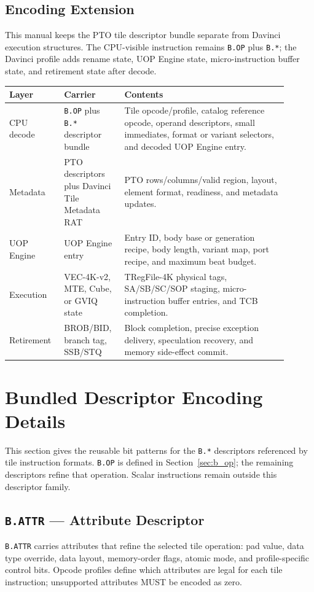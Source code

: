 \subsection{Encoding Extension}
This manual keeps the PTO tile descriptor bundle separate from Davinci execution structures. The CPU-visible instruction remains \texttt{B.OP} plus \texttt{B.*}; the Davinci profile adds rename state, UOP Engine state, micro-instruction buffer state, and retirement state after decode.
\begin{longtable}{@{}L{0.18\linewidth}L{0.18\linewidth}L{0.54\linewidth}@{}}
\toprule
Layer & Carrier & Contents \\
\midrule
CPU decode & \texttt{B.OP} plus \texttt{B.*} descriptor bundle & Tile opcode/profile, catalog reference opcode, operand descriptors, small immediates, format or variant selectors, and decoded UOP Engine entry. \\
Metadata & PTO descriptors plus Davinci Tile Metadata RAT & PTO rows/columns/valid region, layout, element format, readiness, and metadata updates. \\
UOP Engine & UOP Engine entry & Entry ID, body base or generation recipe, body length, variant map, port recipe, and maximum beat budget. \\
Execution & VEC-4K-v2, MTE, Cube, or GVIQ state & TRegFile-4K physical tags, SA/SB/SC/SOP staging, micro-instruction buffer entries, and TCB completion. \\
Retirement & BROB/BID, branch tag, SSB/STQ & Block completion, precise exception delivery, speculation recovery, and memory side-effect commit. \\
\bottomrule
\end{longtable}

\clearpage
\section{Bundled Descriptor Encoding Details}
\label{sec:bundled_descriptor_encoding}

This section gives the reusable bit patterns for the \texttt{B.*} descriptors referenced by tile instruction formats. \texttt{B.OP} is defined in Section~\ref{sec:b_op}; the remaining descriptors refine that operation. Scalar instructions remain outside this descriptor family.

\subsection{\texttt{B.ATTR} --- Attribute Descriptor}
\label{sec:b_attr_descriptor}
\texttt{B.ATTR} carries attributes that refine the selected tile operation: pad value, data type override, data layout, memory-order flags, atomic mode, and profile-specific control bits. Opcode profiles define which attributes are legal for each tile instruction; unsupported attributes MUST be encoded as zero.

